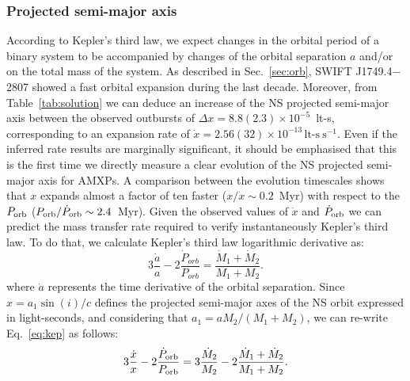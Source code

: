 \documentclass[fleqn,usenatbib]{mnras}
\newcommand{\swiftj}{SWIFT J1749.4$-$2807}
\begin{document}
\subsubsection{Projected semi-major axis}
\label{sec:asin}
According to Kepler's third law, we expect changes in the orbital period of a binary system to be accompanied by changes of the orbital separation $a$ and/or on the total mass of the system. As described in Sec.~\ref{sec:orb}, \swiftj{} showed a fast orbital expansion during the last decade. Moreover, from Table~\ref{tab:solution} we can deduce an increase of the NS projected semi-major axis between the observed outbursts of $\Delta x=8.8(2.3)\times 10^{-5}$~lt-s, corresponding to an expansion rate of $\dot{x}=2.56(32)\times 10^{-13}\,\text{lt-s}~\text{s}^{-1}$. Even if the inferred rate results are marginally significant, it should be emphasised that this is the first time we directly measure a clear evolution of the NS projected semi-major axis for AMXPs. A comparison between the evolution timescales shows that $x$ expands almost a factor of ten faster ($x/\dot{x}\sim 0.2$~Myr) with respect to the $P_{\rm orb}$ ($P_{\rm orb}/\dot{P}_{\rm orb}\sim 2.4$~Myr). 
Given the observed values of $\dot{x}$ and $\dot{P}_{\rm orb}$ we can predict the mass transfer rate required to verify instantaneously Kepler's third law. To do that, we calculate Kepler's third law logarithmic derivative as:
\begin{equation}
\label{eq:kep}
3\frac{\dot{a}}{a}-2\frac{\dot{P}_{orb}}{P_{orb}}=\frac{\dot{M}_1+\dot{M}_2}{M_1+M_2}.
\end{equation}  
where $\dot{a}$ represents the time derivative of the orbital separation. Since $x=a_1 \sin(i)/c$ defines the projected semi-major axes of the NS orbit expressed in light-seconds, and considering that $a_1=aM_2/(M_1+M_2)$, we can re-write Eq.~\ref{eq:kep} as follows:
\begin{equation}
\label{eq:kep2}
3\frac{\dot{x}}{x}-2\frac{\dot{P}_{\rm orb}}{P_{\rm orb}}=3\frac{\dot{M}_2}{M_2}-2\frac{\dot{M}_1+\dot{M}_2}{M_1+M_2}.
\end{equation}
\end{document}
